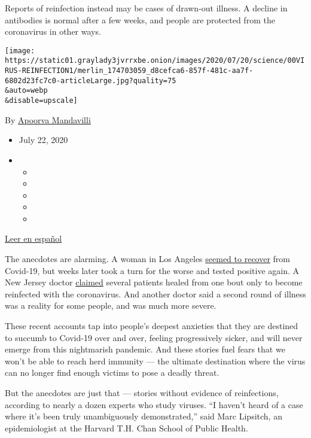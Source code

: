 Reports of reinfection instead may be cases of drawn-out illness. A
decline in antibodies is normal after a few weeks, and people are
protected from the coronavirus in other ways.

\texttt{[image: https://static01.graylady3jvrrxbe.onion/images/2020/07/20/science/00VIRUS-REINFECTION1/merlin\_174703059\_d8cefca6-857f-481c-aa7f-6802d23fc7c0-articleLarge.jpg?quality=75\\\&auto=webp\\\&disable=upscale]}

By
\href{https://www.nytimes3xbfgragh.onion/by/apoorva-mandavilli}{Apoorva
Mandavilli}

\begin{itemize}
\item
  July 22, 2020
\item
  \begin{itemize}
  \item
  \item
  \item
  \item
  \item
  \end{itemize}
\end{itemize}

\href{https://www.nytimes3xbfgragh.onion/es/2020/07/24/espanol/ciencia-y-tecnologia/reinfeccion-coronavirus.html}{Leer
en español}

The anecdotes are alarming. A woman in Los Angeles
\href{https://www.foxla.com/news/southern-california-woman-tests-positive-for-covid-19-for-second-time-after-initial-recovery}{seemed
to recover} from Covid-19, but weeks later took a turn for the worse and
tested positive again. A New Jersey doctor
\href{https://dailyvoice.com/new-jersey/monmouth/news/central-jersey-doctor-reports-patients-reinfected-with-coronavirus/790555/}{claimed}
several patients healed from one bout only to become reinfected with the
coronavirus. And another doctor said a second round of illness was a
reality for some people, and was much more severe.

These recent accounts tap into people's deepest anxieties that they are
destined to succumb to Covid-19 over and over, feeling progressively
sicker, and will never emerge from this nightmarish pandemic. And these
stories fuel fears that we won't be able to reach herd immunity --- the
ultimate destination where the virus can no longer find enough victims
to pose a deadly threat.

But the anecdotes are just that --- stories without evidence of
reinfections, according to nearly a dozen experts who study viruses. ``I
haven't heard of a case where it's been truly unambiguously
demonstrated,'' said Marc Lipsitch, an epidemiologist at the Harvard
T.H. Chan School of Public Health.


